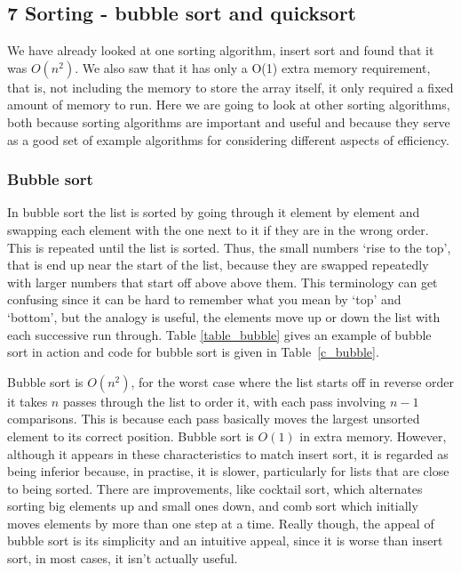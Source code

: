 \documentclass[11pt,a4paper]{scrartcl}
\begin{document}
\subsection*{7 Sorting - bubble sort and quicksort}

We have already looked at one sorting algorithm, insert sort and found
that it was $O(n^2)$. We also saw that it has only a O(1) extra memory
requirement, that is, not including the memory to store the array
itself, it only required a fixed amount of memory to run. Here we are
going to look at other sorting algorithms, both because sorting
algorithms are important and useful and because they serve as a good
set of example algorithms for considering different aspects of
efficiency.

\subsubsection*{Bubble sort}

In bubble sort the list is sorted by going through it element by
element and swapping each element with the one next to it if they are
in the wrong order. This is repeated until the list is sorted. Thus,
the small numbers \lq{}rise to the top\rq{}, that is end up near the
start of the list, because they are swapped repeatedly with larger
numbers that start off above above them. This terminology can get
confusing since it can be hard to remember what you mean by
\lq{}top\rq{} and \lq{}bottom\rq{}, but the analogy is useful, the
elements move up or down the list with each successive run
through. Table \ref{table_bubble} gives an example of bubble sort in
action and code for bubble sort is given in Table~\ref{c_bubble}.

Bubble sort is $O(n^2)$, for the worst case where the list starts off
in reverse order it takes $n$ passes through the list to order it,
with each pass involving $n-1$ comparisons. This is because each pass
basically moves the largest unsorted element to its correct
position. Bubble sort is $O(1)$ in extra memory. However, although it
appears in these characteristics to match insert sort, it is regarded
as being inferior because, in practise, it is slower, particularly for
lists that are close to being sorted. There are improvements, like
cocktail sort, which alternates sorting big elements up and small ones
down, and comb sort which initially moves elements by more than one
step at a time. Really though, the appeal of bubble sort is its
simplicity and an intuitive appeal, since it is worse than insert
sort, in most cases, it isn't actually useful.
\end{document}
